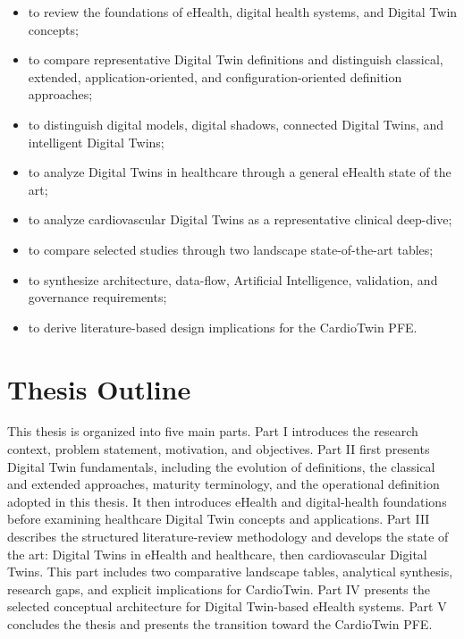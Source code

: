 \begin{itemize}[leftmargin=*]
    \item to review the foundations of eHealth, digital health systems, and Digital Twin concepts;
    \item to compare representative Digital Twin definitions and distinguish classical, extended, application-oriented, and configuration-oriented definition approaches;
    \item to distinguish digital models, digital shadows, connected Digital Twins, and intelligent Digital Twins;
    \item to analyze Digital Twins in healthcare through a general eHealth state of the art;
    \item to analyze cardiovascular Digital Twins as a representative clinical deep-dive;
    \item to compare selected studies through two landscape state-of-the-art tables;
    \item to synthesize architecture, data-flow, Artificial Intelligence, validation, and governance requirements;
    \item to derive literature-based design implications for the CardioTwin PFE.
\end{itemize}

\section{Thesis Outline}
This thesis is organized into five main parts. Part I introduces the research context, problem statement, motivation, and objectives. Part II first presents Digital Twin fundamentals, including the evolution of definitions, the classical and extended approaches, maturity terminology, and the operational definition adopted in this thesis. It then introduces eHealth and digital-health foundations before examining healthcare Digital Twin concepts and applications. Part III describes the structured literature-review methodology and develops the state of the art: Digital Twins in eHealth and healthcare, then cardiovascular Digital Twins. This part includes two comparative landscape tables, analytical synthesis, research gaps, and explicit implications for CardioTwin. Part IV presents the selected conceptual architecture for Digital Twin-based eHealth systems. Part V concludes the thesis and presents the transition toward the CardioTwin PFE.

\clearpage
